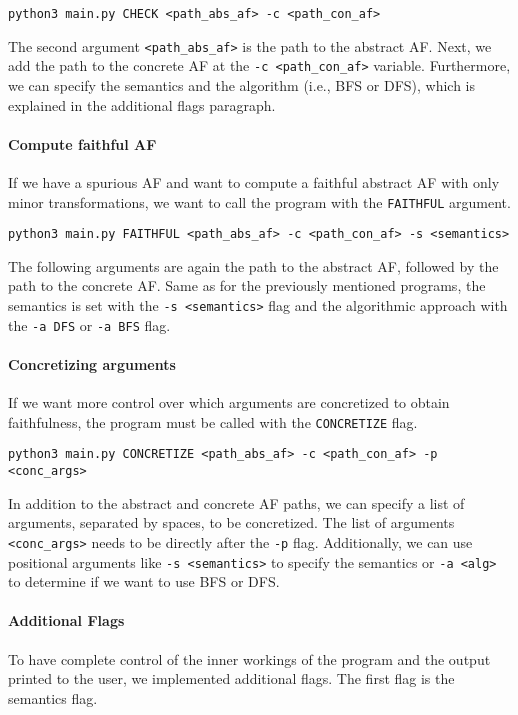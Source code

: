\begin{center}
    \texttt{python3 main.py CHECK <path\_abs\_af> -c <path\_con\_af>}
\end{center}

The second argument \texttt{<path\_abs\_af>} is the path to the abstract AF. Next, we add the path to the concrete AF at the \texttt{-c <path\_con\_af>} variable. Furthermore, we can specify the semantics and the algorithm (i.e., BFS or DFS), which is explained in the additional flags paragraph.


\paragraph{Compute faithful AF} If we have a spurious AF and want to compute a faithful abstract AF with only minor transformations, we want to call the program with the \texttt{FAITHFUL} argument.

\begin{center}
    \texttt{python3 main.py FAITHFUL <path\_abs\_af> -c <path\_con\_af> -s <semantics>}
\end{center}

The following arguments are again the path to the abstract AF, followed by the path to the concrete AF. Same as for the previously mentioned programs, the semantics is set with the \texttt{-s <semantics>} flag and the algorithmic approach with the \texttt{-a DFS} or \texttt{-a BFS} flag.

\paragraph{Concretizing arguments} If we want more control over which arguments are concretized to obtain faithfulness, the program must be called with the \texttt{CONCRETIZE} flag.

\begin{center}
    \texttt{python3 main.py CONCRETIZE <path\_abs\_af> -c <path\_con\_af> -p <conc\_args>}
\end{center}

In addition to the abstract and concrete AF paths, we can specify a list of arguments, separated by spaces, to be concretized. The list of arguments \texttt{<conc\_args>} needs to be directly after the \texttt{-p} flag. Additionally, we can use positional arguments like \texttt{-s <semantics>} to specify the semantics or \texttt{-a <alg>} to determine if we want to use BFS or DFS.

\paragraph{Additional Flags} To have complete control of the inner workings of the program and the output printed to the user, we implemented additional flags. The first flag is the semantics flag.

